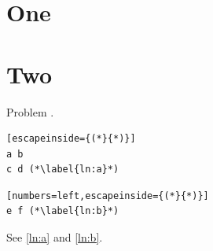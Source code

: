 \documentclass{article}
\newcounter{problem}\setcounter{problem}{40}
\begin{document}
\section{One}
\section{Two}
Problem \theproblem.
\begin{lstlisting}[escapeinside={(*}{*)}]
a b
c d (*\label{ln:a}*)
\end{lstlisting}
\begin{lstlisting}[numbers=left,escapeinside={(*}{*)}]
e f (*\label{ln:b}*)
\end{lstlisting}
See \ref{ln:a} and \ref{ln:b}.
\end{document}
